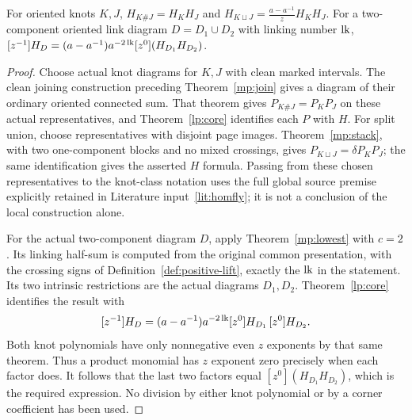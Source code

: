 \begin{lemma}\label{lem:homflyrows}
For oriented knots $K,J$, $H_{K\#J}=H_KH_J$ and
$H_{K\sqcup J}=\frac{a-a^{-1}}zH_KH_J$. For a two-component oriented link
diagram $D=D_1\cup D_2$ with linking number $\operatorname{lk}$,
$[z^{-1}]H_D=(a-a^{-1})a^{-2\operatorname{lk}}[z^0](H_{D_1}H_{D_2})$.
\end{lemma}
\begin{proof}
Choose actual knot diagrams for $K,J$ with clean marked intervals. The
clean joining construction preceding Theorem~\ref{mp:join} gives a diagram
of their ordinary oriented connected sum. That theorem gives
$P_{K\#J}=P_KP_J$ on these actual representatives, and
Theorem~\ref{lp:core} identifies each $P$ with $H$. For split union, choose
representatives with disjoint page images. Theorem~\ref{mp:stack}, with
two one-component blocks and no mixed crossings, gives
$P_{K\sqcup J}=\delta P_KP_J$; the same identification gives the asserted
$H$ formula. Passing from these chosen representatives to the knot-class
notation uses the full global source premise explicitly retained in
Literature input~\ref{lit:homfly}; it is not a conclusion of the local
construction alone.

For the actual two-component diagram $D$, apply Theorem~\ref{mp:lowest}
with $c=2$. Its linking half-sum is computed from the original common
presentation, with the crossing signs of
Definition~\ref{def:positive-lift}, exactly the $\operatorname{lk}$ in the statement.
Its two intrinsic restrictions are the actual diagrams $D_1,D_2$.
Theorem~\ref{lp:core} identifies the result with
\[
[z^{-1}]H_D=(a-a^{-1})a^{-2\operatorname{lk}}[z^0]H_{D_1}\,[z^0]H_{D_2}.
\]
Both knot polynomials have only nonnegative even $z$ exponents by that
same theorem. Thus a product monomial has $z$ exponent zero precisely
when each factor does. It follows that the last two factors equal
$[z^0](H_{D_1}H_{D_2})$, which is the required expression. No division
by either knot polynomial or by a corner coefficient has been used.
\end{proof}


